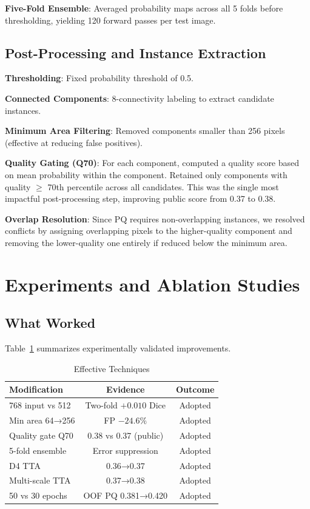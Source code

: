 \documentclass[conference]{IEEEtran}
\begin{document}
\textbf{Five-Fold Ensemble}: Averaged probability maps across all 5 folds before thresholding, yielding 120 forward passes per test image.

\subsection{Post-Processing and Instance Extraction}

\textbf{Thresholding}: Fixed probability threshold of 0.5.

\textbf{Connected Components}: 8-connectivity labeling to extract candidate instances.

\textbf{Minimum Area Filtering}: Removed components smaller than 256 pixels (effective at reducing false positives).

\textbf{Quality Gating (Q70)}: For each component, computed a quality score based on mean probability within the component. Retained only components with quality $\geq$ 70th percentile across all candidates. This was the single most impactful post-processing step, improving public score from 0.37 to 0.38.

\textbf{Overlap Resolution}: Since PQ requires non-overlapping instances, we resolved conflicts by assigning overlapping pixels to the higher-quality component and removing the lower-quality one entirely if reduced below the minimum area.

\section{Experiments and Ablation Studies}

\subsection{What Worked}

Table~\ref{tab:effective} summarizes experimentally validated improvements.

\begin{table}[h]
\centering
\caption{Effective Techniques}
\label{tab:effective}
\small
\begin{tabular}{@{}lcc@{}}
\toprule
\textbf{Modification} & \textbf{Evidence} & \textbf{Outcome} \\
\midrule
768 input vs 512 & Two-fold $+0.010$ Dice & Adopted \\
Min area 64→256 & FP $-24.6\%$ & Adopted \\
Quality gate Q70 & 0.38 vs 0.37 (public) & Adopted \\
5-fold ensemble & Error suppression & Adopted \\
D4 TTA & 0.36→0.37 & Adopted \\
Multi-scale TTA & 0.37→0.38 & Adopted \\
50 vs 30 epochs & OOF PQ 0.381→0.420 & Adopted \\
\bottomrule
\end{tabular}
\end{table}
\end{document}
